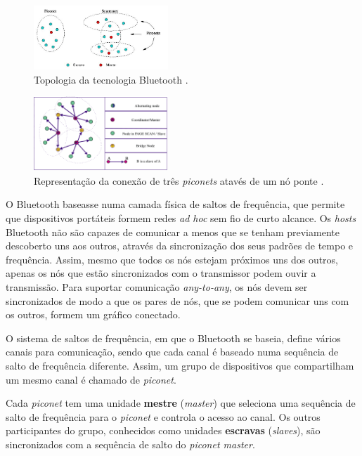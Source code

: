 \documentclass[conference]{IEEEtran}
\begin{document}
\begin{figure}[!t]
  \centering
  \includegraphics[width=0.45\textwidth]{Esquema_Bluetooth.png}
  \caption{Topologia da tecnologia Bluetooth \cite{blueesptec}.}
  \label{fig:topBluet}
\end{figure}

\begin{figure}[!t]
  \centering
  \includegraphics[width=0.45\textwidth]{no_ponte.png}
  \caption{Representação da conexão de três \textit{piconets} atavés de um nó ponte \cite{salonidis2005distributed}.}
  \label{fig:noPonte}
\end{figure}

O Bluetooth baseasse numa camada física de saltos de frequência, que permite que dispositivos portáteis formem redes \textit{ad hoc} sem fio de curto alcance. 
Os \textit{hosts} Bluetooth não são capazes de comunicar a menos que se tenham previamente descoberto uns aos outros, através da sincronização dos seus padrões de tempo e frequência. 
Assim, mesmo que todos os nós estejam próximos uns dos outros, apenas os nós que estão sincronizados com o transmissor podem ouvir a transmissão.
Para suportar comunicação \textit{any-to-any}, os nós devem ser sincronizados de modo a que os pares de nós, que se podem comunicar uns com os outros, formem um gráfico conectado.

O sistema de saltos de frequência, em que o Bluetooth se baseia, define vários canais para comunicação, sendo que cada canal é baseado numa sequência de salto de frequência diferente. 
Assim, um grupo de dispositivos que compartilham um mesmo canal é chamado de \textit{piconet}. 

Cada \textit{piconet} tem uma unidade \textbf{mestre} (\textit{master}) que seleciona uma sequência de salto de frequência para o \textit{piconet} e controla o acesso ao canal. 
Os outros participantes do grupo, conhecidos como unidades \textbf{escravas} (\textit{slaves}), são sincronizados com a sequência de salto do \textit{piconet master}. 
\end{document}
